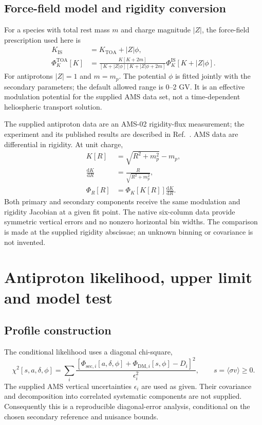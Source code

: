 \documentclass[11pt,a4paper]{article}
\newcommand{\sv}{\langle\sigma v\rangle}
\newcommand{\dd}{\mathrm{d}}
\begin{document}
\subsection{Force-field model and rigidity conversion}
For a species with total rest mass $m$ and charge magnitude $|Z|$, the force-field prescription used here is
\begin{align}
K_{\mathrm{IS}} &= K_{\mathrm{TOA}}+|Z|\phi,\\
\Phi^{\mathrm{TOA}}_K[K] & =
\frac{K[K+2m]}{[K+|Z|\phi][K+|Z|\phi+2m]}
\Phi^{\mathrm{IS}}_K[K+|Z|\phi].
\end{align}
For antiprotons $|Z|=1$ and $m=m_p$. The potential $\phi$ is fitted jointly with the secondary parameters; the default allowed range is 0--2 GV. It is an effective modulation potential for the supplied AMS data set, not a time-dependent heliospheric transport solution.

The supplied antiproton data are an AMS-02 rigidity-flux measurement; the experiment and its published results are described in Ref.~\cite{AMS:2021FirstSevenYears}. AMS data are differential in rigidity. At unit charge,
\begin{align}
K[R] &= \sqrt{R^2+m_p^2}-m_p,\\
\frac{\dd K}{\dd R} &= \frac{R}{\sqrt{R^2+m_p^2}},\\
\Phi_R[R] &= \Phi_K[K[R]]\frac{\dd K}{\dd R}.
\end{align}
Both primary and secondary components receive the same modulation and rigidity Jacobian at a given fit point. The native six-column data provide symmetric vertical errors and no nonzero horizontal bin widths. The comparison is made at the supplied rigidity abscissae; an unknown binning or covariance is not invented.

\section{Antiproton likelihood, upper limit and model test}
\subsection{Profile construction}
The conditional likelihood uses a diagonal chi-square,
\begin{equation}
\chi^2[s,a,\delta,\phi]=\sum_i
\frac{\left[\Phi_{\mathrm{sec},i}[a,\delta,\phi]+\Phi_{\mathrm{DM},i}[s,\phi]-D_i\right]^2}{\epsilon_i^2},
\qquad s=\sv\geq0.
\end{equation}
The supplied AMS vertical uncertainties $\epsilon_i$ are used as given. Their covariance and decomposition into correlated systematic components are not supplied. Consequently this is a reproducible diagonal-error analysis, conditional on the chosen secondary reference and nuisance bounds.
\end{document}
